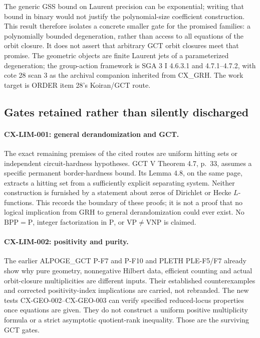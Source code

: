\documentclass[11pt,a4paper]{article}
\begin{document}
The generic GSS bound on Laurent precision can be exponential; writing
that bound in binary would not justify the polynomial-size coefficient
construction. This result therefore isolates a concrete smaller gate for
the promised families: a polynomially bounded degeneration, rather than
access to all equations of the orbit closure. It does not assert that
arbitrary GCT orbit closures meet that promise. The geometric objects are
finite Laurent jets of a parameterized degeneration; the group-action
framework is SGA 3 I 4.6.3.1 and 4.7.1--4.7.2, with cote 28 scan 3 as the
archival companion inherited from CX\_GRH. The work target is ORDER item
28's Koiran/GCT route.

\subsection{Gates retained rather than silently discharged}

\paragraph{CX-LIM-001: general derandomization and GCT.}
The exact remaining premises of the cited routes are uniform hitting sets
or independent circuit-hardness hypotheses. GCT V Theorem 4.7, p.~33,
assumes a specific permanent border-hardness bound. Its Lemma 4.8, on the
same page, extracts a hitting set from a sufficiently explicit separating
system. Neither construction is furnished by a statement about zeros of
Dirichlet or Hecke $L$-functions. This records the boundary of these proofs;
it is not a proof that no logical implication from GRH to general
derandomization could ever exist. No $\mathrm{BPP}=\mathrm P$, integer
factorization in $\mathrm P$, or $\mathrm{VP}\ne\mathrm{VNP}$ is claimed.

\paragraph{CX-LIM-002: positivity and purity.}
The earlier ALPOGE\_GCT P-F7 and P-F10 and PLETH PLE-F5/F7 already show
why pure geometry, nonnegative Hilbert data, efficient counting and actual
orbit-closure multiplicities are different inputs. Their established
counterexamples and corrected positivity-index implications are carried,
not rebranded. The new tests CX-GEO-002--CX-GEO-003 can verify specified
reduced-locus properties once equations are given. They do not construct a
uniform positive multiplicity formula or a strict asymptotic quotient-rank
inequality. Those are the surviving GCT gates.
\end{document}
